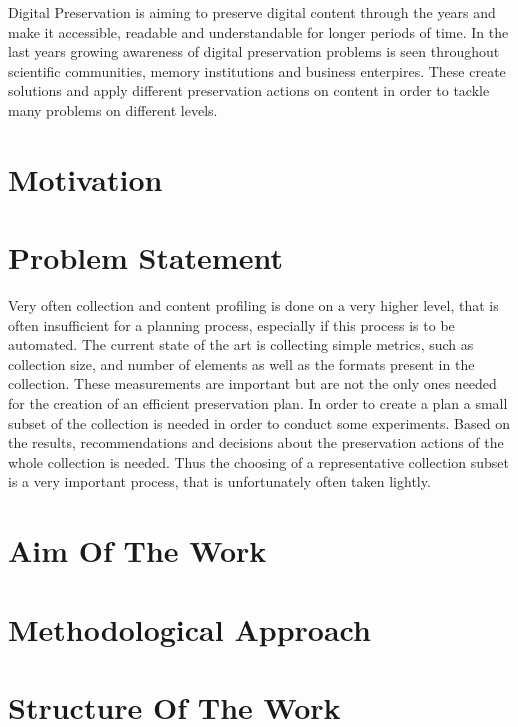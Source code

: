 Digital Preservation is aiming to preserve digital content through the years and make it accessible, readable and understandable for longer periods of time. In the last years growing awareness of digital preservation problems is seen throughout scientific communities, memory institutions and business enterpires. These create solutions and apply different preservation actions on content in order to tackle many problems on different levels.

\section{Motivation}
\section{Problem Statement}
Very often collection and content profiling is done on a very higher level, that
is often insufficient for a planning process, especially if this process is to be automated.
The current state of the art is collecting simple metrics, such as collection size, and number of elements as well as the formats present in the collection. These measurements are important but are not the only ones needed for the creation of an efficient preservation plan.
In order to create a plan a small subset of the collection is needed in order to conduct some experiments. Based on the results, recommendations and decisions about the preservation actions of the whole collection is needed. Thus the choosing of a representative collection subset is a very important process, that is unfortunately often taken lightly.


\section{Aim Of The Work}
\section{Methodological Approach}
\section{Structure Of The Work}